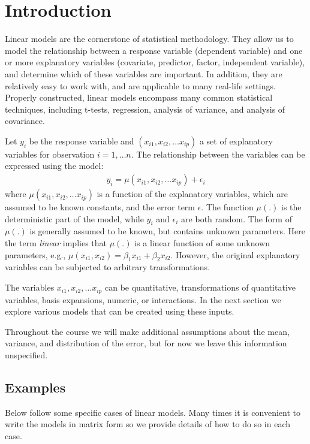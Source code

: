 \section{Introduction}

Linear models are the cornerstone of statistical methodology. They allow us to model the relationship between a response variable (dependent variable) and one or more explanatory variables (covariate, predictor, factor, independent variable), and determine which of these variables are important. In addition, they are relatively easy to work with, and are applicable to many real-life settings.  Properly constructed, linear models encompass many common statistical techniques, including t-tests, regression, analysis of variance, and analysis of covariance.

Let $y_i$ be the response variable and $(x_{i1}, x_{i2}, \ldots x_{ip})$ a set of explanatory variables for observation $i=1, \ldots n$. The relationship between the variables can be expressed using the model:
\begin{align}
y_i = \mu(x_{i1}, x_{i2}, \ldots x_{ip}) + \epsilon_i \label{LM}
\end{align}
where $\mu(x_{i1}, x_{i2}, \ldots x_{ip})$ is a function of the explanatory variables, which are assumed to be known constants, and the error term $\epsilon$. 
The function $\mu(.)$ is the deterministic part of the model, while $y_i$ and $\epsilon_i$ are both random. The form of $\mu(.)$ is generally assumed to be known, but contains unknown parameters.  Here the term {\it linear} implies that $\mu(.)$ is a linear function of some unknown parameters,
e.g.,  $\mu(x_{i1},x_{i2}) = \beta_1 x_{i1} + \beta_2 x_{i2}$. However, the original explanatory variables can be subjected to arbitrary transformations.

The variables $x_{i1}, x_{i2}, \ldots x_{ip}$ can be quantitative, transformations of quantitative variables, basis expansions, numeric, or interactions. In the next section we explore various models that can be created using these inputs. 


Throughout the course we will make additional assumptions about the mean, variance, and distribution of the error, but for now we leave this information unspecified. 

\subsection{Examples}

Below follow some specific cases of linear models. Many times it is convenient to write the models in matrix form so we provide details of how to do so in each case. 

